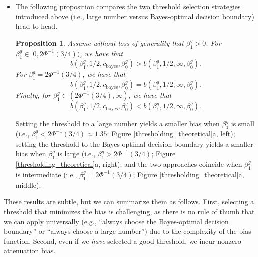 \documentclass[12pt]{article}
\newtheorem{proposition}{Proposition}
\begin{document}
\begin{itemize}
 \item The following proposition compares the two threshold selection strategies introduced above (i.e., large number versus Bayes-optimal decision boundary) head-to-head.
 \begin{proposition}\label{prop:comparison} Assume without loss of generality that $\beta^g_1 > 0$. For $\beta^g_1 \in [0, 2\Phi^{-1}(3/4))$, we have that $$b(\beta^g_1, 1/2, c_\textrm{bayes}, \beta^g_0) > b(\beta^g_1, 1/2, \infty, \beta^g_0).$$ For $\beta^g_1 = 2\Phi^{-1}(3/4)$, we have that $$ b(\beta^g_1, 1/2, c_\textrm{bayes}, \beta^g_0) = b(\beta^g_1, 1/2, \infty, \beta^g_0).$$ Finally, for $\beta^g_1 \in (2\Phi^{-1}(3/4), \infty)$, we have that
 $$b(\beta^g_1, 1/2, c_\textrm{bayes}, \beta^g_0) < b(\beta^g_1, 1/2, \infty, \beta^g_0).$$
 \end{proposition}
Setting the threshold to a large number yields a smaller bias when $\beta^g_1$ is small (i.e., $\beta^g_1 < 2\Phi^{-1}(3/4) \approx 1.35$; Figure \ref{thresholding_theoretical}a, left); setting the threshold to the Bayes-optimal decision boundary yields a smaller bias when $\beta^g_1$ is large (i.e., $\beta^g_1 > 2\Phi^{-1}(3/4)$; Figure \ref{thresholding_theoretical}a, right); and the two approaches coincide when $\beta^g_1$ is intermediate (i.e., $\beta^g_1 = 2\Phi^{-1}(3/4)$; Figure \ref{thresholding_theoretical}a, middle).
\end{itemize}

These results are subtle, but we can summarize them as follows. First, selecting a threshold that minimizes the bias is challenging, as there is no rule of thumb that we can apply universally (e.g., ``always choose the Bayes-optimal decision boundary'' or ``always choose a large number'') due to the complexity of the bias function. Second, even if we \textit{have} selected a good threshold, we incur nonzero attenuation bias.
\end{document}
